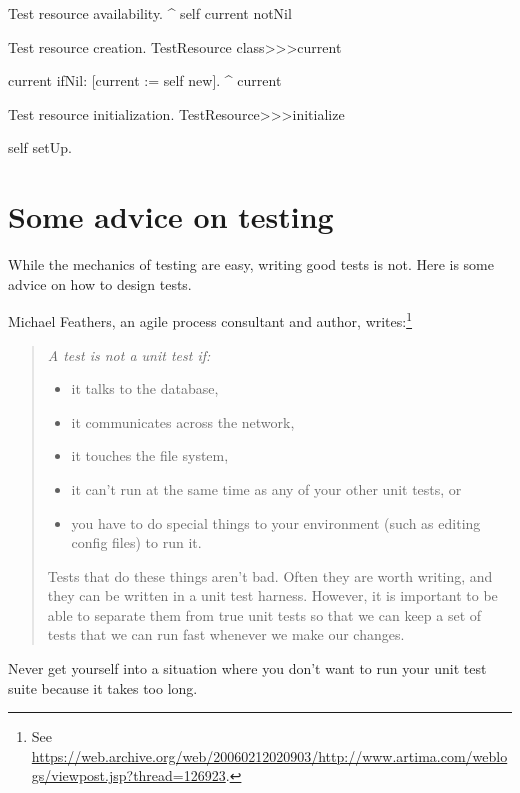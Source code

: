 \documentclass[a4paper,10pt,twoside]{book}
\begin{document}
{\begin{method}[testresourceisavailable]{Test resource availability.}
	^ self current notNil
\end{method}
\begin{method}[testresourcecurrent]{Test resource creation.}
TestResource class>>>current

	current ifNil: [current := self new].
	^ current
\end{method}
\begin{method}[restresourceinitialize]{Test resource initialization.}
TestResource>>>initialize

	self setUp.
\end{method}
\section{Some advice on testing}

While the mechanics of testing are easy, writing good tests is not.
Here is some advice on how to design tests.

\begin{description}

\item[Feathers' Rules for Unit tests.]
	Michael Feathers, an  agile process consultant and author, writes:\footnote{See \url{https://web.archive.org/web/20060212020903/http://www.artima.com/weblogs/viewpost.jsp?thread=126923}.}
	\begin{quotation}
	\noindent
	{\it
	A test is not a unit test if:
	\begin{itemize}
		\item it talks to the database,
		\item it communicates across the network,
		\item it touches the file system,
		\item it can't run at the same time as any of your other unit tests, or
		\item you have to do special things to your environment (such as editing config files) to run it.
	\end{itemize}
	Tests that do these things aren't bad.
	Often they are worth writing, and they can be written in a unit test harness.
	However, it is important to be able to separate them from true unit tests so that we can keep a set of tests that we can run fast whenever we make our changes.
 	}
	\end{quotation}
	Never get yourself into a situation where you don't want to run your unit test suite because it takes too long.


\end{description}}
\end{document}
